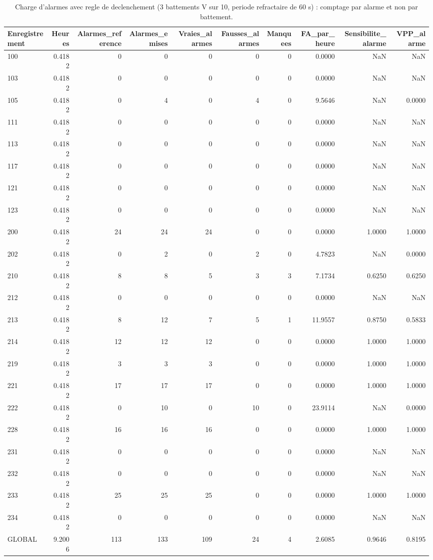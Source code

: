 \begin{table}
\caption{Charge d'alarmes avec regle de declenchement (3 battements V sur 10, periode refractaire de 60 s) : comptage par alarme et non par battement.}
\label{tab:alarms_debounced}
\begin{tabular}{lrrrrrrrrr}
\toprule
Enregistrement & Heures & Alarmes_reference & Alarmes_emises & Vraies_alarmes & Fausses_alarmes & Manquees & FA_par_heure & Sensibilite_alarme & VPP_alarme \\
\midrule
100 & 0.4182 & 0 & 0 & 0 & 0 & 0 & 0.0000 & NaN & NaN \\
103 & 0.4182 & 0 & 0 & 0 & 0 & 0 & 0.0000 & NaN & NaN \\
105 & 0.4182 & 0 & 4 & 0 & 4 & 0 & 9.5646 & NaN & 0.0000 \\
111 & 0.4182 & 0 & 0 & 0 & 0 & 0 & 0.0000 & NaN & NaN \\
113 & 0.4182 & 0 & 0 & 0 & 0 & 0 & 0.0000 & NaN & NaN \\
117 & 0.4182 & 0 & 0 & 0 & 0 & 0 & 0.0000 & NaN & NaN \\
121 & 0.4182 & 0 & 0 & 0 & 0 & 0 & 0.0000 & NaN & NaN \\
123 & 0.4182 & 0 & 0 & 0 & 0 & 0 & 0.0000 & NaN & NaN \\
200 & 0.4182 & 24 & 24 & 24 & 0 & 0 & 0.0000 & 1.0000 & 1.0000 \\
202 & 0.4182 & 0 & 2 & 0 & 2 & 0 & 4.7823 & NaN & 0.0000 \\
210 & 0.4182 & 8 & 8 & 5 & 3 & 3 & 7.1734 & 0.6250 & 0.6250 \\
212 & 0.4182 & 0 & 0 & 0 & 0 & 0 & 0.0000 & NaN & NaN \\
213 & 0.4182 & 8 & 12 & 7 & 5 & 1 & 11.9557 & 0.8750 & 0.5833 \\
214 & 0.4182 & 12 & 12 & 12 & 0 & 0 & 0.0000 & 1.0000 & 1.0000 \\
219 & 0.4182 & 3 & 3 & 3 & 0 & 0 & 0.0000 & 1.0000 & 1.0000 \\
221 & 0.4182 & 17 & 17 & 17 & 0 & 0 & 0.0000 & 1.0000 & 1.0000 \\
222 & 0.4182 & 0 & 10 & 0 & 10 & 0 & 23.9114 & NaN & 0.0000 \\
228 & 0.4182 & 16 & 16 & 16 & 0 & 0 & 0.0000 & 1.0000 & 1.0000 \\
231 & 0.4182 & 0 & 0 & 0 & 0 & 0 & 0.0000 & NaN & NaN \\
232 & 0.4182 & 0 & 0 & 0 & 0 & 0 & 0.0000 & NaN & NaN \\
233 & 0.4182 & 25 & 25 & 25 & 0 & 0 & 0.0000 & 1.0000 & 1.0000 \\
234 & 0.4182 & 0 & 0 & 0 & 0 & 0 & 0.0000 & NaN & NaN \\
GLOBAL & 9.2006 & 113 & 133 & 109 & 24 & 4 & 2.6085 & 0.9646 & 0.8195 \\
\bottomrule
\end{tabular}
\end{table}
